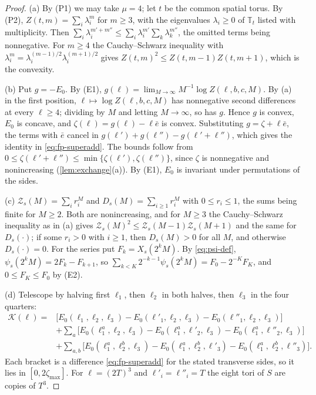 \documentclass[11pt,a4paper]{amsart}
\theoremstyle{definition}
\theoremstyle{remark}
\numberwithin{equation}{section}
\newcommand{\TT}{\mathbb{T}}               %
\newcommand{\Zc}{\mathcal{Z}}              %
\newcommand{\Zs}[2]{\Zc_{#1}(#2)}          %
\newcommand{\XT}[2]{X_{#1}(#2)}            %
\newcommand{\Dexc}[2]{D_{#1}(#2)}          %
\newcommand{\psiT}[2]{\psi_{#1}(#2)}       %
\newcommand{\cube}[1]{(2#1)^3}             %
\begin{document}
\begin{proof}
(a) By (P1) we may take $\mu=4$; let $t$ be the common spatial torus. By (P2), $Z(t,m)=\sum_i\lambda_i^m$ for $m\ge3$, with the eigenvalues $\lambda_i\ge0$ of $\TT_t$ listed with multiplicity. Then $\sum_i\lambda_i^{m'+m''}\le\sum_i\lambda_i^{m'}\sum_k\lambda_k^{m''}$, the omitted terms being nonnegative. For $m\ge4$ the Cauchy--Schwarz inequality with $\lambda_i^m=\lambda_i^{(m-1)/2}\lambda_i^{(m+1)/2}$ gives $Z(t,m)^2\le Z(t,m-1)Z(t,m+1)$, which is the convexity.

(b) Put $g=-E_0$. By (E1), $g(\ell)=\lim_{M\to\infty}M^{-1}\log Z(\ell,b,c,M)$. By (a) in the first position, $\ell\mapsto\log Z(\ell,b,c,M)$ has nonnegative second differences at every $\ell\ge4$; dividing by $M$ and letting $M\to\infty$, so has $g$. Hence $g$ is convex, $E_0$ is concave, and $\zeta(\ell)=g(\ell)-\ell\bar e$ is convex. Substituting $g=\zeta+\ell\bar e$, the terms with $\bar e$ cancel in $g(\ell')+g(\ell'')-g(\ell'+\ell'')$, which gives the identity in \eqref{eq:fp-superadd}. The bounds follow from $0\le\zeta(\ell'+\ell'')\le\min\{\zeta(\ell'),\zeta(\ell'')\}$, since $\zeta$ is nonnegative and nonincreasing (\cref{lem:exchange}(a)). By (E1), $E_0$ is invariant under permutations of the sides.

(c) $\Zs{s}{M}=\sum_ir_i^M$ and $\Dexc{s}{M}=\sum_{i\ge1}r_i^M$ with $0\le r_i\le1$, the sums being finite for $M\ge2$. Both are nonincreasing, and for $M\ge3$ the Cauchy--Schwarz inequality as in (a) gives $\Zs{s}{M}^2\le\Zs{s}{M-1}\Zs{s}{M+1}$ and the same for $\Dexc{s}{\cdot}$; if some $r_i>0$ with $i\ge1$, then $\Dexc{s}{M}>0$ for all $M$, and otherwise $\Dexc{s}{\cdot}=0$. For the series put $F_k=\XT{s}{2^kM}$. By \eqref{eq:psi-def}, $\psiT{s}{2^kM}=2F_k-F_{k+1}$, so $\sum_{k<K}2^{-k-1}\psiT{s}{2^kM}=F_0-2^{-K}F_K$, and $0\le F_K\le F_0$ by (E2).

(d) Telescope by halving first $\ell_1$, then $\ell_2$ in both halves, then $\ell_3$ in the four quarters:
\begin{align*}
\mathcal K(\ell)={}&\bigl[E_0(\ell_1,\ell_2,\ell_3)-E_0(\ell'_1,\ell_2,\ell_3)-E_0(\ell''_1,\ell_2,\ell_3)\bigr]\\
&+\sum_{a}\bigl[E_0(\ell_1^a,\ell_2,\ell_3)-E_0(\ell_1^a,\ell'_2,\ell_3)-E_0(\ell_1^a,\ell''_2,\ell_3)\bigr]\\
&+\sum_{a,b}\bigl[E_0(\ell_1^a,\ell_2^b,\ell_3)-E_0(\ell_1^a,\ell_2^b,\ell'_3)-E_0(\ell_1^a,\ell_2^b,\ell''_3)\bigr].
\end{align*}
Each bracket is a difference \eqref{eq:fp-superadd} for the stated transverse sides, so it lies in $[0,2\zeta_{\max}]$. For $\ell=\cube{T}$ and $\ell'_i=\ell''_i=T$ the eight tori of $S$ are copies of $T^3$.
\end{proof}
\end{document}
